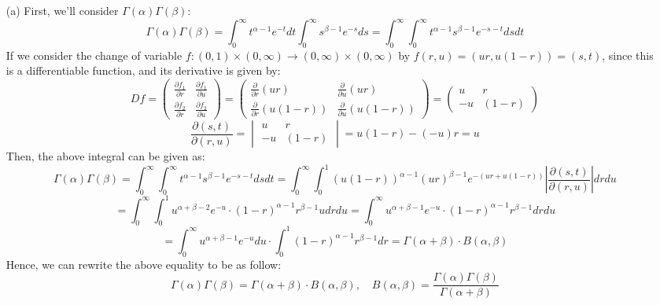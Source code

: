 \documentclass{article}
\begin{document}
\begin{itemize}
    \item[(a)] First, we'll consider $\Gamma(\alpha)\Gamma(\beta)$:
    $$\Gamma(\alpha)\Gamma(\beta)=\int_{0}^{\infty}t^{\alpha-1}e^{-t}dt\int_{0}^{\infty}s^{\beta-1}e^{-s}ds=\int_{0}^{\infty}\int_{0}^{\infty}t^{\alpha-1}s^{\beta-1}e^{-s-t}dsdt$$
    If we consider the change of variable $f:(0,1)\times (0,\infty)\rightarrow (0,\infty)\times (0,\infty)$ by $f(r,u)=(ur,u(1-r))=(s,t)$, since this is a differentiable function, and its derivative is given by:
    $$Df = \begin{pmatrix}
        \frac{\partial f_1}{\partial r}&\frac{\partial f_1}{\partial u}\\
        \frac{\partial f_2}{\partial r}&\frac{\partial f_2}{\partial u}
    \end{pmatrix}=\begin{pmatrix}
        \frac{\partial}{\partial r}(ur)&\frac{\partial}{\partial u}(ur)\\
        \frac{\partial}{\partial r}(u(1-r))&\frac{\partial}{\partial u}(u(1-r))
    \end{pmatrix}=\begin{pmatrix}
        u&r\\
        -u&(1-r) 
    \end{pmatrix}$$
    $$\frac{\partial (s,t)}{\partial (r,u)}=\begin{vmatrix}
        u&r\\-u&(1-r)
    \end{vmatrix}=u(1-r)-(-u)r=u$$
    Then, the above integral can be given as:
    $$\Gamma(\alpha)\Gamma(\beta)=\int_{0}^{\infty}\int_{0}^{\infty}t^{\alpha-1}s^{\beta-1}e^{-s-t}dsdt = \int_{0}^{\infty}\int_{0}^{1}(u(1-r))^{\alpha-1}(ur)^{\beta-1}e^{-(ur+u(1-r))}\left|\frac{\partial (s,t)}{\partial (r,u)}\right|drdu$$
    $$=\int_{0}^{\infty}\int_{0}^{1}u^{\alpha+\beta-2}e^{-u}\cdot (1-r)^{\alpha-1}r^{\beta-1}udrdu=\int_{0}^{\infty}u^{\alpha+\beta-1}e^{-u}\cdot (1-r)^{\alpha-1}r^{\beta-1}drdu$$
    $$=\int_{0}^{\infty}u^{\alpha+\beta-1}e^{-u}du\cdot\int_{0}^{1}(1-r)^{\alpha-1}r^{\beta-1}dr = \Gamma(\alpha+\beta)\cdot B(\alpha,\beta)$$
    Hence, we can rewrite the above equality to be as follow:
    $$\Gamma(\alpha)\Gamma(\beta)=\Gamma(\alpha+\beta)\cdot B(\alpha,\beta),\quad B(\alpha,\beta)=\frac{\Gamma(\alpha)\Gamma(\beta)}{\Gamma(\alpha+\beta)}$$
    
    \hfil 


\end{itemize}
\end{document}
